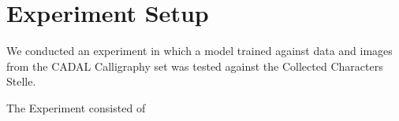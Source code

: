 \chapter{Experiment Setup}

We conducted an experiment in which a model trained against data and images from the CADAL Calligraphy set was tested against the Collected Characters Stelle.

The Experiment consisted of 
